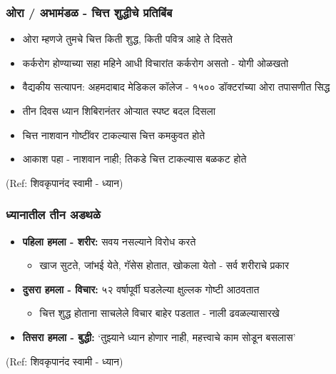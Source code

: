 \begin{frame}[fragile]\frametitle{ओरा / अभामंडळ - चित्त शुद्धीचे प्रतिबिंब}

	\begin{itemize}
	\item ओरा म्हणजे तुमचे चित्त किती शुद्ध, किती पवित्र आहे ते दिसते
	\item कर्करोग होण्याच्या सहा महिने आधी विचारांत कर्करोग असतो - योगी ओळखतो
	\item वैद्यकीय सत्यापन: अहमदाबाद मेडिकल कॉलेज - १५०० डॉक्टरांच्या ओरा तपासणीत सिद्ध
	\item तीन दिवस ध्यान शिबिरानंतर ओऱ्यात स्पष्ट बदल दिसला
	\item चित्त नाशवान गोष्टींवर टाकल्यास चित्त कमकुवत होते
	\item आकाश पहा - नाशवान नाही; तिकडे चित्त टाकल्यास बळकट होते
	\end{itemize}

{\tiny (Ref: शिवकृपानंद स्वामी - ध्यान)}

\end{frame}

\begin{frame}[fragile]\frametitle{ध्यानातील तीन अडथळे}

	\begin{itemize}
	\item \textbf{पहिला हमला - शरीर:} सवय नसल्याने विरोध करते
		\begin{itemize}
		\item खाज सुटते, जांभई येते, गॅसेस होतात, खोकला येतो - सर्व शरीराचे प्रकार
		\end{itemize}
	\item \textbf{दुसरा हमला - विचार:} ५२ वर्षापूर्वी घडलेल्या क्षुल्लक गोष्टी आठवतात
		\begin{itemize}
		\item चित्त शुद्ध होताना साचलेले विचार बाहेर पडतात - नाली ढवळल्यासारखे
		\end{itemize}
	\item \textbf{तिसरा हमला - बुद्धी:} `तुझ्याने ध्यान होणार नाही, महत्त्वाचे काम सोडून बसलास'
	\end{itemize}

{\tiny (Ref: शिवकृपानंद स्वामी - ध्यान)}

\end{frame}

